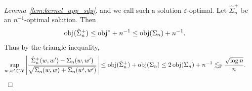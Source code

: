 \begin{proof}[Lemma~\ref{lem:kernel_app_sdp}]
  and we call such a solution $\varepsilon$-optimal.
  Let $\hat \Sigma_n^+$ be an $n^{-1}$-optimal solution.
  Then
  \begin{align*}
    \mathrm{obj}(\hat \Sigma_n^+)
    &\leq \mathrm{obj}^* + n^{-1}
    \leq \mathrm{obj}(\Sigma_n) + n^{-1}.
  \end{align*}
  Thus by the triangle inequality,
  \begin{align*}
    \sup_{w,w' \in \mathcal{W}}
    \left|
    \frac{\hat \Sigma_n^+(w,w') - \Sigma_n(w,w')}
    {\sqrt{\Sigma_n(w,w) + \Sigma_n(w',w')}}
    \right|
    &\leq
    \mathrm{obj}(\hat \Sigma_n^+)
    + \mathrm{obj}(\Sigma_n)
    \leq 2 \, \mathrm{obj}(\Sigma_n) + n^{-1}
    \lesssim_{\mathbb{P}}
    \frac{\sqrt{\log n}}{n}.
  \end{align*}
\end{proof}

